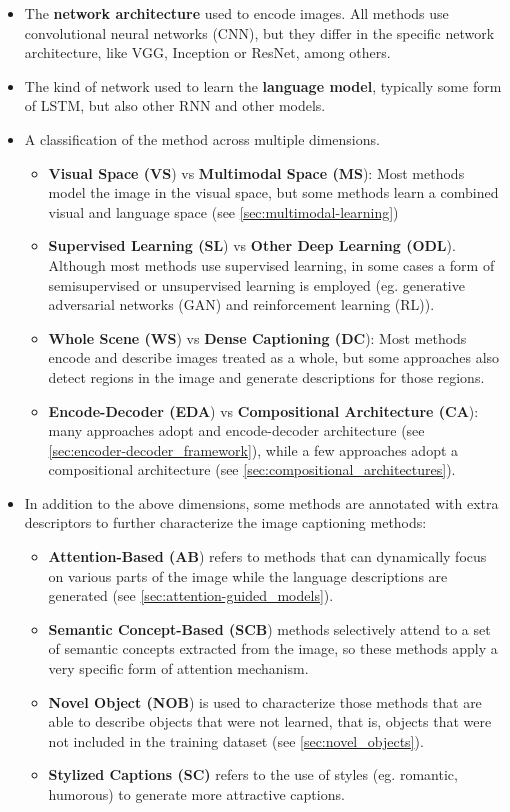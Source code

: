 \begin{itemize}
\item The \textbf{network architecture} used to encode images. All methods use convolutional neural networks (CNN), but they differ in the specific network architecture, like VGG, Inception or ResNet, among others.
\item The kind of network used to learn the \textbf{language model}, typically some form of LSTM, but also other RNN and other models.
\item A classification of the method across multiple dimensions.
    \begin{itemize}
    \item \textbf{Visual Space (VS}) vs \textbf{Multimodal Space (MS}): Most methods model the image in the visual space, but some methods learn a combined visual and language space (see \cref{sec:multimodal-learning})
    \item \textbf{Supervised Learning (SL}) vs \textbf{Other Deep Learning (ODL}). Although most methods use supervised learning, in some cases a form of semisupervised or unsupervised learning is employed (eg. generative adversarial networks (GAN) and reinforcement learning (RL)).
    \item \textbf{Whole Scene (WS}) vs \textbf{Dense Captioning (DC}): Most methods encode and describe images treated as a whole, but some approaches also detect regions in the image and generate descriptions for those regions.
    \item \textbf{Encode-Decoder (EDA}) vs \textbf{Compositional Architecture (CA}): many approaches adopt and encode-decoder architecture (see \cref{sec:encoder-decoder_framework}), while a few approaches adopt a compositional architecture (see \cref{sec:compositional_architectures}).
    \end{itemize}
\item In addition to the above dimensions, some methods are annotated with extra descriptors to further characterize the image captioning methods:
    \begin{itemize}
    \item \textbf{Attention-Based (AB}) refers to methods that can dynamically focus on various parts of the image while the language descriptions are generated (see \cref{sec:attention-guided_models}).
    \item \textbf{Semantic Concept-Based (SCB}) methods selectively attend to a set of semantic concepts extracted from the image, so these methods apply a very specific form of attention mechanism.
    \item \textbf{Novel Object (NOB}) is used to characterize those methods that are able to describe objects that were not learned, that is, objects that were not included in the training dataset (see \cref{sec:novel_objects}).
    \item \textbf{Stylized Captions (SC)} refers to the use of styles  (eg. romantic, humorous) to generate more attractive captions. 
    \end{itemize}
\end{itemize}


